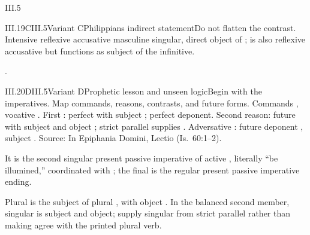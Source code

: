 \begin{courseunit}{III.5}
\begin{worksheet}{III.19}{C}{III.5}{Variant C}{Philippians indirect statement}{Do not flatten the contrast.}
  {Intensive reflexive accusative masculine singular, direct object of
  ;  is also reflexive accusative but functions as
  subject of the infinitive.}

  {}

  {.}
\end{worksheet}

\begin{worksheet}{III.20}{D}{III.5}{Variant D}{Prophetic lesson and unseen logic}{Begin with the imperatives.}
  {Map commands, reasons, contrasts, and future forms.}
  {Commands , vocative . First
  : perfect  with subject ;
   perfect deponent. Second reason: future
   with subject  and object ;
  strict parallel supplies . Adversative
  : future deponent , subject .
  Source: In Epiphania Domini, Lectio (Is.~60:1--2).}

  {It is the second singular present passive imperative of active
  , literally ``be illumined,'' coordinated with
  ; the final  is the regular present passive
  imperative ending.}


  {Plural  is the subject of plural , with
  object . In the balanced second member, singular
   is subject and  object; supply singular
  \Latin{[operiet]} from strict parallel rather than making 
  agree with the printed plural verb.}


\end{worksheet}
\end{courseunit}
